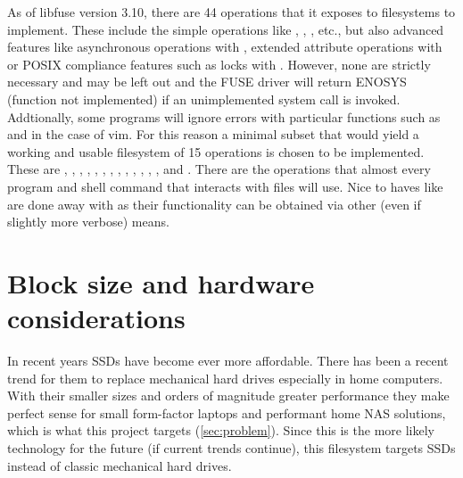         As of libfuse version 3.10, there are 44 operations that it exposes to
        filesystems to implement. These include the simple operations like
        , , , etc., but also
        advanced features like asynchronous operations with ,
        extended attribute operations with  or POSIX
        compliance features such as locks with . However, none
        are strictly necessary and may be left out and the FUSE driver will
        return ENOSYS (function not implemented) if an unimplemented system
        call is invoked. Addtionally, some programs will ignore errors with
        particular functions such as  and  in
        the case of vim. For this reason a minimal subset that would yield a
        working and usable filesystem of 15 operations is chosen to be
        implemented. These are , ,
        , , ,
        , , , ,
        , , , ,
         and . There are the operations that
        almost every program and shell command that interacts with files will
        use. Nice to haves like  are done away with as their
        functionality can be obtained via other (even if slightly more verbose)
        means.

    \section{Block size and hardware considerations}
        \label{sec:block_size}

        In recent years SSDs have become ever more affordable. There has been a
        recent trend for them to replace mechanical hard drives
        \cite{SSD_sales} especially in home computers. With their smaller sizes
        and orders of magnitude greater performance they make perfect sense for
        small form-factor laptops and performant home NAS solutions, which is
        what this project targets (\autoref{sec:problem}). Since this is the more
        likely technology for the future (if current trends continue), this
        filesystem targets SSDs instead of classic mechanical hard drives.

